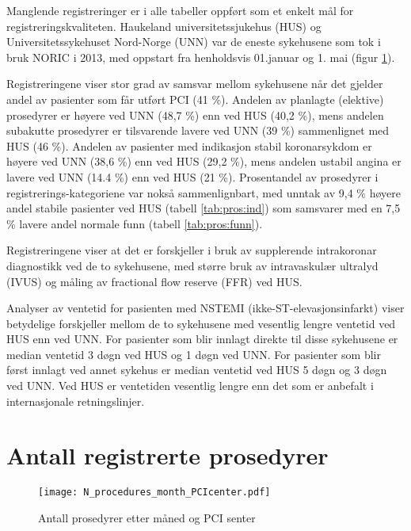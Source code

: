\documentclass[norsk, a4paper]{report}
\begin{document}
Manglende registreringer er i alle tabeller oppført som et enkelt mål for registreringskvaliteten. Haukeland universitetssjukehus (HUS) og Universitetssykehuset Nord-Norge (UNN) var de eneste sykehusene som tok i bruk NORIC i 2013, med oppstart fra henholdsvis 01.januar og 1. mai (figur \ref{fig:N:SHUS}). 

Registreringene viser stor grad av samsvar mellom sykehusene når det gjelder andel av pasienter som får utført PCI (41 \%). Andelen av planlagte (elektive) prosedyrer er høyere ved UNN (48,7 \%) enn ved HUS (40,2 \%), mens andelen subakutte prosedyrer er tilsvarende lavere ved UNN (39 \%) sammenlignet med HUS (46 \%). Andelen av pasienter med indikasjon stabil koronarsykdom er høyere ved UNN (38,6 \%) enn ved HUS (29,2 \%), mens andelen ustabil angina er lavere ved UNN (14.4 \%) enn ved HUS (21 \%). Prosentandel av prosedyrer i registrerings-kategoriene var nokså sammenlignbart, med unntak av 9,4 \% høyere andel stabile pasienter ved HUS (tabell \ref{tab:pros:ind}) som samsvarer med en 7,5 \% lavere andel normale funn (tabell \ref{tab:pros:funn}).

Registreringene viser at det er forskjeller i bruk av supplerende intrakoronar diagnostikk ved de to sykehusene, med større bruk av intravaskulær ultralyd (IVUS) og måling av fractional flow reserve (FFR) ved HUS. 

Analyser av ventetid for pasienten med NSTEMI (ikke-ST-elevasjonsinfarkt) viser betydelige forskjeller mellom de to sykehusene med vesentlig lengre ventetid ved HUS enn ved UNN. For pasienter som blir innlagt direkte til disse sykehusene er median ventetid 3 døgn ved HUS og 1 døgn ved UNN.  For pasienter som blir først innlagt ved annet sykehus er median ventetid ved HUS 5 døgn og 3 døgn ved UNN.  Ved HUS er ventetiden vesentlig lengre enn det som er anbefalt i internasjonale retningslinjer.  



\section{Antall registrerte prosedyrer}

\begin{figure}[ht]
  \centering
  \label{fig:N:SHUS}

\texttt{[image: N\_procedures\_month\_PCIcenter.pdf]}\caption{Antall prosedyrer etter måned og PCI senter}
\end{figure}
\end{document}
